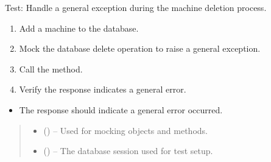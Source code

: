 \documentclass[letterpaper,10pt,english]{sphinxmanual}
\begin{document}

\begin{fulllineitems}
\label{\detokenize{test:test.test_machine.test_delete_machine_general_exception}}
\pysigstartsignatures
\pysiglinewithargsret
{}
{\sphinxparamcomma {}}
{}
\pysigstopsignatures
\sphinxAtStartPar
Test: Handle a general exception during the machine deletion process.
\begin{description}
\begin{enumerate}
%
\item {} 
\sphinxAtStartPar
Add a machine to the database.

\item {} 
\sphinxAtStartPar
Mock the database delete operation to raise a general exception.

\item {} 
\sphinxAtStartPar
Call the  method.

\item {} 
\sphinxAtStartPar
Verify the response indicates a general error.

\end{enumerate}

\begin{itemize}
\item {} 
\sphinxAtStartPar
The response should indicate a general error occurred.

\end{itemize}

\end{description}
\begin{quote}\begin{description}
\begin{itemize}
\item {} 
\sphinxAtStartPar
{} () – Used for mocking objects and methods.

\item {} 
\sphinxAtStartPar
{} () – The database session used for test setup.

\end{itemize}

\end{description}\end{quote}

\end{fulllineitems}
\end{document}
